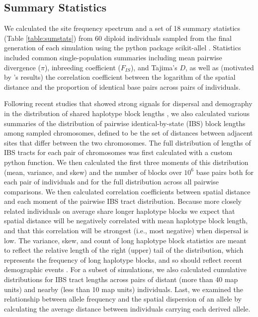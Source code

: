 \documentclass[10pt,twoside,lineno,hidelinks]{preprint}
\begin{document}
\subsection{Summary Statistics}
We calculated the site frequency spectrum and a set of 18 summary statistics (Table \ref{table:sumstats}) from 60 diploid individuals sampled from the final generation of each simulation using the python package scikit-allel \citep{Miles2017}. 
Statistics included common single-population summaries including mean pairwise divergence ($\pi$), inbreeding coefficient ($F_{IS}$), and Tajima's $D$, 
as well as (motivated by \citet{Rousset1997}'s results)
the correlation coefficient between the logarithm of the spatial distance and the proportion of identical base pairs across pairs of individuals. 

Following recent studies that showed strong signals for dispersal and demography in the distribution of shared haplotype block lengths \citep[e.g.,][]{Ringbauer2017,Baharian2016}, we also calculated various summaries of the distribution of pairwise identical-by-state (IBS) block lengths among sampled chromosomes,
defined to be the set of distances between adjacent sites that differ between the two chromosomes. 
The full distribution of lengths of IBS tracts for each pair of chromosomes was first calculated with a custom python function. 
We then calculated the first three moments of this distribution (mean, variance, and skew) and the number of blocks over $10^6$ base pairs both for each pair of individuals and for the full distribution across all pairwise comparisons. 
We then calculated correlation coefficients between spatial distance and each moment of the pairwise IBS tract distribution. Because more closely related individuals on average share longer haplotype blocks we expect that spatial distance will be negatively correlated with mean haplotype block length, and that this correlation will be strongest (i.e., most negative) when dispersal is low. The variance, skew, and count of long haplotype block statistics are meant to reflect the relative length of the right (upper) tail of the distribution, which represents the frequency of long haplotype blocks, and so should reflect recent demographic events \citep{chapman2002effect}. For a subset of simulations, we also calculated cumulative distributions for IBS tract lengths across pairs of distant (more than 40 map units) and nearby (less than 10 map units) individuals. Last, we examined the relationship between allele frequency and the spatial dispersion of an allele by calculating the average distance between individuals carrying each derived allele.
\end{document}
